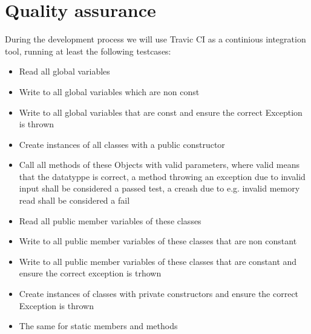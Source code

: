 \chapter{Quality assurance}
During the development process we will use Travic CI as a continious integration tool, running at least the following testcases:
\begin{itemize}
\item Read all global variables
\item Write to all global variables which are non const
\item Write to all global variables that are const and ensure the correct Exception is thrown
\item Create instances of all classes with a public constructor
\item Call all methods of these Objects with valid parameters, where valid means that the datatyppe is correct, a method throwing an exception due to invalid input shall be considered a passed test, a creash due to e.g. invalid memory read shall be considered a fail
\item Read all public member variables of these classes
\item Write to all public member variables of these classes that are non constant
\item Write to all public member variables of these classes that are constant and ensure the correct exception is trhown
\item Create instances of classes with private constructors and ensure the correct Exception is thrown
\item The same for static members and methods
\end{itemize}
